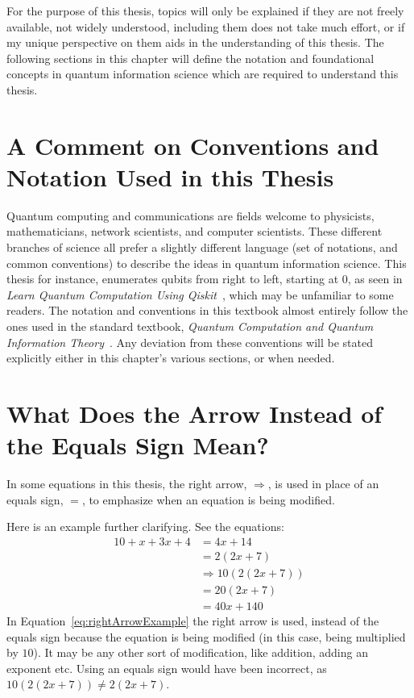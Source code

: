 For the purpose of this thesis, topics will only be explained if they are not freely available, not widely understood, including them does not take much effort, or if my unique perspective on them aids in the understanding of this thesis. The following sections in this chapter will define the notation and foundational concepts in quantum information science which are required to understand this thesis.
\section{A Comment on Conventions and Notation Used in this Thesis}
Quantum computing and communications are fields welcome to physicists, mathematicians, network scientists, and computer scientists. These different branches of science all prefer a slightly different language (set of notations, and common conventions) to describe the ideas in quantum information science. This thesis for instance, enumerates qubits from right to left, starting at 0, as seen in \emph{Learn Quantum Computation Using Qiskit}~\cite{Qiskit-Textbook}, which may be unfamiliar to some readers. The notation and conventions in this textbook almost entirely follow the ones used in the standard textbook, \emph{Quantum Computation and Quantum Information Theory}~\cite{nielsen2002quantum}. Any deviation from these conventions will be stated explicitly either in this chapter's various sections, or when needed.
\section{What Does the Arrow Instead of the Equals Sign Mean?}
\label{sec:whatDoesTheArrowInsteadOfEqualsSignMean}
In some equations in this thesis, the right arrow, $\Rightarrow$, is used in place of an equals sign, $=$, to emphasize when an equation is being modified.
\begin{example}
Here is an example further clarifying. See the equations:
\begin{align}
10 + x + 3x + 4 &= 4x + 14\\
&=2(2x + 7)\\
&\Rightarrow 10(2(2x + 7))\label{eq:rightArrowExample}\\
&= 20(2x + 7)\\
&=40x + 140
\end{align}
In Equation~\eqref{eq:rightArrowExample} the right arrow is used, instead of the equals sign because the equation is being modified (in this case, being multiplied by $10$). It may be any other sort of modification, like addition, adding an exponent etc. Using an equals sign would have been incorrect, as $10(2(2x + 7)) \neq 2(2x + 7)$.
\end{example}
